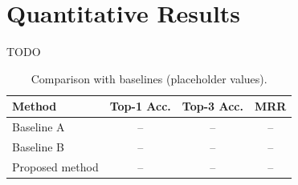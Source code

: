 \section{Quantitative Results}\label{sec:res_quant}
TODO

\begin{table}[H]
  \centering
  \caption{Comparison with baselines (placeholder values).}
  \label{tab:results}
  \begin{tabular}{lccc}
    \toprule
    \textbf{Method} & \textbf{Top-1 Acc.} & \textbf{Top-3 Acc.} & \textbf{MRR} \\
    \midrule
    Baseline A      & --   & --   & --   \\
    Baseline B      & --   & --   & --   \\
    Proposed method & --   & --   & --   \\
    \bottomrule
  \end{tabular}
\end{table}
